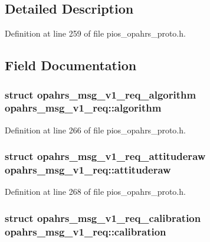 \subsection{Detailed Description}


Definition at line 259 of file pios\-\_\-opahrs\-\_\-proto.\-h.



\subsection{Field Documentation}
\hypertarget{unionopahrs__msg__v1__req_a40bfdd5f491c63422404a2163a0f281d}{
\subsubsection[{algorithm}]{\setlength{\rightskip}{0pt plus 5cm}struct {\bf opahrs\-\_\-msg\-\_\-v1\-\_\-req\-\_\-algorithm} opahrs\-\_\-msg\-\_\-v1\-\_\-req\-::algorithm}}\label{unionopahrs__msg__v1__req_a40bfdd5f491c63422404a2163a0f281d}


Definition at line 266 of file pios\-\_\-opahrs\-\_\-proto.\-h.

\hypertarget{unionopahrs__msg__v1__req_a8b47c9f9b79ebb014a60ed0f6f00d814}{
\subsubsection[{attituderaw}]{\setlength{\rightskip}{0pt plus 5cm}struct {\bf opahrs\-\_\-msg\-\_\-v1\-\_\-req\-\_\-attituderaw} opahrs\-\_\-msg\-\_\-v1\-\_\-req\-::attituderaw}}\label{unionopahrs__msg__v1__req_a8b47c9f9b79ebb014a60ed0f6f00d814}


Definition at line 268 of file pios\-\_\-opahrs\-\_\-proto.\-h.

\hypertarget{unionopahrs__msg__v1__req_a50a5ac629409b37aa3943a8f6a98e768}{
\subsubsection[{calibration}]{\setlength{\rightskip}{0pt plus 5cm}struct {\bf opahrs\-\_\-msg\-\_\-v1\-\_\-req\-\_\-calibration} opahrs\-\_\-msg\-\_\-v1\-\_\-req\-::calibration}}\label{unionopahrs__msg__v1__req_a50a5ac629409b37aa3943a8f6a98e768}


